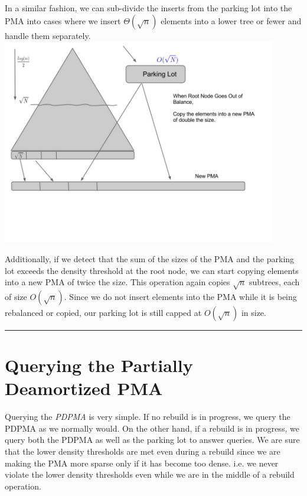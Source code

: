 \documentclass[10pt]{article}
\newenvironment{proof}{{\bf Proof:  }}{\hfill\rule{2mm}{2mm}}
\begin{document}
\begin{proof}
\begin{enumerate}
\end{enumerate}

In a similar fashion, we can sub-divide the inserts from the parking
lot into the PMA into cases where we insert $\Theta(\sqrt{n})$
elements into a lower tree or fewer and handle them separately. \\

\includegraphics[width=120mm]{img2.jpg}

Additionally, if we detect that the sum of the sizes of the PMA and
the parking lot exceeds the density threshold at the root node, we can
start copying elements into a new PMA of twice the size. This
operation again copies $\sqrt{n}$ subtrees, each of size
$O(\sqrt{n})$. Since we do not insert elements into the PMA while it
is being rebalanced or copied, our parking lot is still capped at
$O(\sqrt{n})$ in size.

\end{proof}

\section{Querying the Partially Deamortized PMA}

Querying the \textit{PDPMA} is very simple. If no rebuild is in
progress, we query the PDPMA as we normally would. On the other hand,
if a rebuild is in progress, we query both the PDPMA as well as the
parking lot to answer queries. We are sure that the lower density
thresholds are met even during a rebuild since we are making the PMA
more sparse only if it has become too dense. i.e. we never violate the
lower density thresholds even while we are in the middle of a rebuild
operation.
\end{document}
